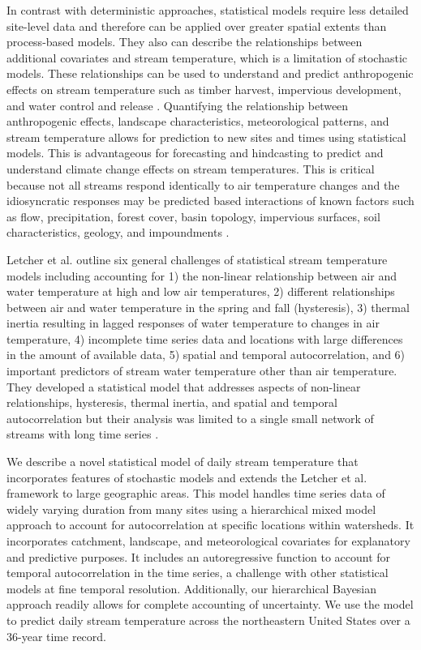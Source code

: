 \documentclass[]{article}
\begin{document}
In contrast with deterministic approaches, statistical models require
less detailed site-level data and therefore can be applied over greater
spatial extents than process-based models. They also can describe the
relationships between additional covariates and stream temperature,
which is a limitation of stochastic models. These relationships can be
used to understand and predict anthropogenic effects on stream
temperature such as timber harvest, impervious development, and water
control and release \citep{Webb2008}. Quantifying the relationship
between anthropogenic effects, landscape characteristics, meteorological
patterns, and stream temperature allows for prediction to new sites and
times using statistical models. This is advantageous for forecasting and
hindcasting to predict and understand climate change effects on stream
temperatures. This is critical because not all streams respond
identically to air temperature changes and the idiosyncratic responses
may be predicted based interactions of known factors such as flow,
precipitation, forest cover, basin topology, impervious surfaces, soil
characteristics, geology, and impoundments \citep{Webb2008}.

Letcher et al. \citeyearpar{Letcher2016t} outline six general challenges
of statistical stream temperature models including accounting for 1) the
non-linear relationship between air and water temperature at high and
low air temperatures, 2) different relationships between air and water
temperature in the spring and fall (hysteresis), 3) thermal inertia
resulting in lagged responses of water temperature to changes in air
temperature, 4) incomplete time series data and locations with large
differences in the amount of available data, 5) spatial and temporal
autocorrelation, and 6) important predictors of stream water temperature
other than air temperature. They developed a statistical model that
addresses aspects of non-linear relationships, hysteresis, thermal
inertia, and spatial and temporal autocorrelation but their analysis was
limited to a single small network of streams with long time series
\citep{Letcher2016t}.

We describe a novel statistical model of daily stream temperature that
incorporates features of stochastic models and extends the Letcher et
al. \citeyearpar{Letcher2016t} framework to large geographic areas. This
model handles time series data of widely varying duration from many
sites using a hierarchical mixed model approach to account for
autocorrelation at specific locations within watersheds. It incorporates
catchment, landscape, and meteorological covariates for explanatory and
predictive purposes. It includes an autoregressive function to account
for temporal autocorrelation in the time series, a challenge with other
statistical models at fine temporal resolution. Additionally, our
hierarchical Bayesian approach readily allows for complete accounting of
uncertainty. We use the model to predict daily stream temperature across
the northeastern United States over a 36-year time record.
\end{document}
